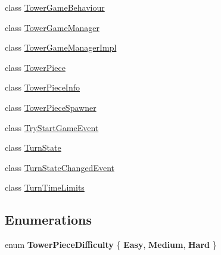 \begin{DoxyCompactItemize}
\item 
class \hyperlink{class_tower_v_r_1_1_tower_game_behaviour}{Tower\+Game\+Behaviour}
\item 
class \hyperlink{class_tower_v_r_1_1_tower_game_manager}{Tower\+Game\+Manager}
\item 
class \hyperlink{class_tower_v_r_1_1_tower_game_manager_impl}{Tower\+Game\+Manager\+Impl}
\item 
class \hyperlink{class_tower_v_r_1_1_tower_piece}{Tower\+Piece}
\item 
class \hyperlink{class_tower_v_r_1_1_tower_piece_info}{Tower\+Piece\+Info}
\item 
class \hyperlink{class_tower_v_r_1_1_tower_piece_spawner}{Tower\+Piece\+Spawner}
\item 
class \hyperlink{class_tower_v_r_1_1_try_start_game_event}{Try\+Start\+Game\+Event}
\item 
class \hyperlink{class_tower_v_r_1_1_turn_state}{Turn\+State}
\item 
class \hyperlink{class_tower_v_r_1_1_turn_state_changed_event}{Turn\+State\+Changed\+Event}
\item 
class \hyperlink{class_tower_v_r_1_1_turn_time_limits}{Turn\+Time\+Limits}
\end{DoxyCompactItemize}
\subsection*{Enumerations}
\begin{DoxyCompactItemize}
\item 
enum {\bfseries Tower\+Piece\+Difficulty} \{ {\bfseries Easy}, 
{\bfseries Medium}, 
{\bfseries Hard}
 \}\hypertarget{namespace_tower_v_r_a84917c8a9c1c65b2e7428f40c090f273}{}\label{namespace_tower_v_r_a84917c8a9c1c65b2e7428f40c090f273}

\end{DoxyCompactItemize}
